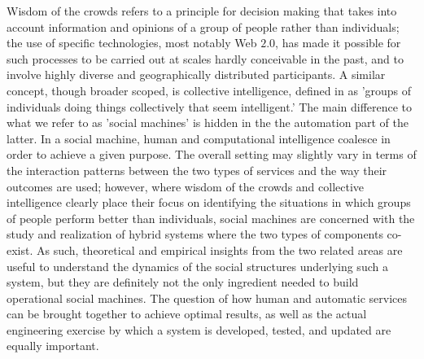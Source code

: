 \documentclass{sig-alternate}
\begin{document}
Wisdom of the crowds \cite{surowiecki2005wisdom} refers to a principle for decision making that takes into account information and opinions of a group of people rather than individuals; the use of specific technologies, most notably Web $2.0$, has made it possible for such processes to be carried out at scales hardly conceivable in the past, and to involve highly diverse and geographically distributed participants. A similar concept, though broader scoped, is collective intelligence, defined in  \cite{malone2009harnessing} as 'groups of individuals doing things collectively that seem intelligent.' The main difference to what we refer to as 'social machines' is hidden in the the automation part of the latter. In a social machine, human and computational intelligence coalesce in order to achieve a given purpose. The overall setting may slightly vary in terms of the interaction patterns between the two types of services and the way their outcomes are used; however, where wisdom of the crowds and collective intelligence clearly place their focus on identifying the situations in which groups of people perform better than individuals, social machines are concerned with the study and realization of hybrid systems where the two types of components co-exist. As such, theoretical and empirical insights from the two related areas are useful to understand the dynamics of the social structures underlying such a system, but they are definitely not the only ingredient needed to build operational social machines. The question of how human and automatic services can be brought together to achieve optimal results, as well as the actual engineering exercise by which a system is developed, tested, and updated are equally important.
\end{document}
